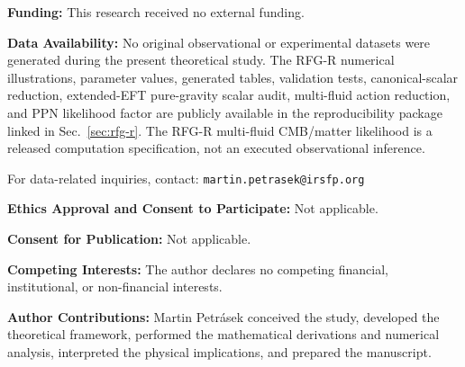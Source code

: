 \documentclass[11pt,a4paper]{article}
\begin{document}
\noindent
\textbf{Funding:}
This research received no external funding.

\medskip

\noindent
\textbf{Data Availability:}
No original observational or experimental datasets were generated during the
present theoretical study. The RFG-R numerical illustrations, parameter values,
generated tables, validation tests, canonical-scalar reduction, extended-EFT pure-gravity scalar audit, multi-fluid action reduction, and PPN likelihood factor are publicly
available in the reproducibility package linked in Sec.~\ref{sec:rfg-r}.
The RFG-R multi-fluid CMB/matter likelihood is a released computation
specification, not an executed observational inference.

\medskip

\noindent
For data-related inquiries, contact:
\texttt{martin.petrasek@irsfp.org}

\medskip

\noindent
\textbf{Ethics Approval and Consent to Participate:}
Not applicable.

\medskip

\noindent
\textbf{Consent for Publication:}
Not applicable.

\medskip

\noindent
\textbf{Competing Interests:}
The author declares no competing financial, institutional, or non-financial interests.

\medskip

\noindent
\textbf{Author Contributions:}
Martin Petrásek conceived the study, developed the theoretical framework,
performed the mathematical derivations and numerical analysis, interpreted the
physical implications, and prepared the manuscript.
\end{document}
